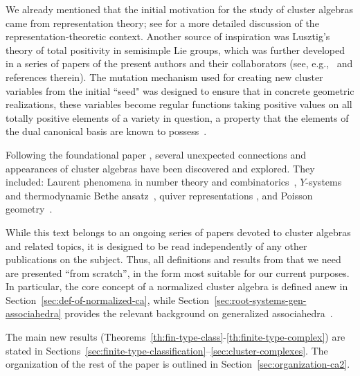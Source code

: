\documentclass[letterpaper]{amsart}
\numberwithin{equation}{section}
\theoremstyle{definition}
\begin{document}
\pagebreak[2]

We already mentioned that the initial motivation for the study of 
cluster algebras came from representation theory; 
see \cite{camblec} for a more detailed discussion of the 
representation-theoretic context. 
Another source of inspiration was Lusztig's theory of 
total positivity in semisimple Lie groups, which 
was further developed in a series of papers of the 
present authors and their collaborators (see, e.g.,~\cite{Lu2, FZ1} and 
references therein). 
The mutation mechanism used for creating new cluster variables from the initial 
``seed" was designed to ensure that in concrete geometric realizations, these 
variables become regular functions taking positive values on all 
totally positive elements of a variety in question, 
a property that the elements of the dual canonical basis are known to
possess~\cite{Lu1}.  
 
Following the foundational paper \cite{fz-clust1}, several 
unexpected connections and appearances of cluster algebras have been 
discovered and explored. 
They included: Laurent phenomena in number theory and 
combinatorics~\cite{fz-laurent}, 
$Y$-systems and thermodynamic Bethe ansatz~\cite{yga}, 
quiver representations \cite{mrz}, 
and Poisson geometry~\cite{GSV}. 
 

While this text belongs to an ongoing series of papers devoted to cluster 
algebras and related topics, it is designed to be read independently of 
any other publications on the subject. 
Thus, all definitions and results from \cite{fz-clust1,yga,cfz} 
that we need are presented ``from scratch'', in the form most suitable for our 
current purposes. 
In particular, the core concept of a normalized cluster algebra 
\cite{fz-clust1} is defined anew in 
Section~\ref{sec:def-of-normalized-ca}, while 
Section~\ref{sec:root-systems-gen-associahedra} provides 
the relevant background on generalized associahedra~\cite{yga,cfz}. 


 
The main new results 
(Theorems~\ref{th:fin-type-class}-\ref{th:finite-type-complex}) 
are stated in 
Sections~\ref{sec:finite-type-classification}--\ref{sec:cluster-complexes}. 
The organization of the rest of the paper is outlined in 
Section~\ref{sec:organization-ca2}. 
 
 
\pagebreak[2] 
 
\end{document}
